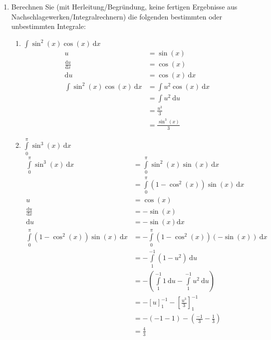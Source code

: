 \documentclass[10pt]{article}
\begin{document}

\noindent
\begin{enumerate}[start=5,leftmargin=1in]

    \item Berechnen Sie (mit Herleitung/Begründung, keine fertigen Ergebnisse aus 
    Nachschlagewerken/Integralrechnern) die folgenden bestimmten oder unbestimmten Integrale:
    \begin{enumerate}

        \item $\int \sin^2{(x)} \cos{(x)} \: \text{d}x$
        \begin{align*}
            u &= \sin(x) \\
            \frac{\text{d}u}{\text{d}x} &= \cos(x) \\
            \text{d}u &= \cos(x) \: \text{d}x \\ 
            \int \sin^2{(x)} \cos{(x)} \: \text{d}x &= \int u^2 \cos(x) \: \text{d}x \\
            &= \int u^2 \: \text{d}u \\
            &= \frac{u^3}{3} \\
            &= \frac{\sin^3(x)}{3}
        \end{align*}

        \item $\int\limits_{0}^{\pi} \sin^3(x) \: \text{d}x$
        \begin{align*}
            \int\limits_{0}^{\pi} \sin^3(x) \: \text{d}x &= \int\limits_{0}^{\pi} \sin^2(x) \sin(x) \: \text{d}x \\
            &= \int\limits_{0}^{\pi} (1 - \cos^2(x)) \sin(x) \: \text{d}x \\
            u &= \cos(x) \\
            \frac{\text{d}u}{\text{d}x} &= - \sin(x) \\
            \text{d}u &= - \sin(x) \text{d}x \\
            \int\limits_{0}^{\pi} (1 - \cos^2(x)) \sin(x) \: \text{d}x &= - \int\limits_{0}^{\pi} (1 - \cos^2(x)) (-\sin(x)) \: \text{d}x \\
            &= - \int\limits_{1}^{-1} (1 - u^2) \: \text{d}u \\
            &= - \left(\int\limits_{1}^{-1} 1 \: \text{d}u - \int\limits_{1}^{-1} u^2 \: \text{d}u\right) \\
            &= - \left[u\right]_{1}^{-1} - \left[\frac{u^3}{3}\right]_{1}^{-1} \\
            &= - (-1 - 1) - \left(\frac{-1}{3} - \frac{1}{3}\right) \\
            &= \frac{4}{3}
        \end{align*}


\end{enumerate}
\end{enumerate}
\end{document}
